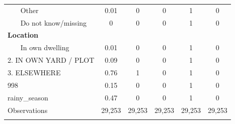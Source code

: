 \begin{table}[htbp]
\begin{tabular}{l*{5}{c}}
~~~ Other        &        0.01&        0&        0&        1&        0\\
~~~ Do not know/missing&        0&        0&        0&        1&        0\\
\textbf{Location} \\\hline ~~~ In own dwelling&        0.01&        0&        0&        1&        0\\
2. IN OWN YARD / PLOT&        0.09&        0&        0&        1&        0\\
3. ELSEWHERE        &        0.76&        1&        0&        1&        0\\
998                 &        0.15&        0&        0&        1&        0\\
rainy_season        &        0.47&        0&        0&        1&        0\\
\hline
Observations        &      29,253&      29,253&      29,253&      29,253&      29,253\\
\hline\hline
\multicolumn{6}{p{0.87\linewidth}}{\footnotesize }\\
\end{tabular}
\end{table}
